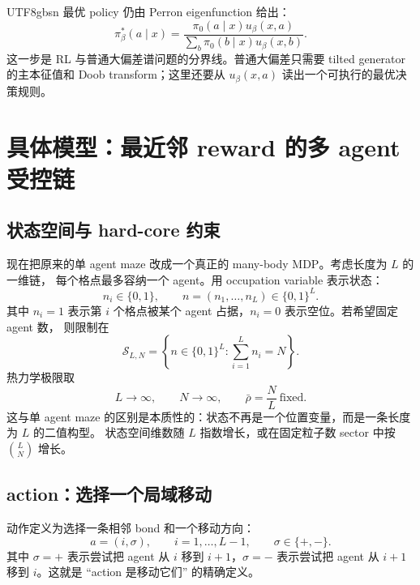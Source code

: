 \documentclass[11pt]{article}
\begin{document}
\begin{CJK*}{UTF8}{gbsn}
最优 policy 仍由 Perron eigenfunction 给出：
\begin{equation}
    \pi_\beta^*(a\mid x)
    =
    \frac{\pi_0(a\mid x)u_\beta(x,a)}
    {\sum_b\pi_0(b\mid x)u_\beta(x,b)}.
    \label{eq:many-body-policy}
\end{equation}
这一步是 RL 与普通大偏差谱问题的分界线。普通大偏差只需要 tilted generator 的主本征值和 Doob
transform；这里还要从 \(u_\beta(x,a)\) 读出一个可执行的最优决策规则。

\section{具体模型：最近邻 reward 的多 agent 受控链}

\subsection{状态空间与 hard-core 约束}

现在把原来的单 agent maze 改成一个真正的 many-body MDP。考虑长度为 \(L\) 的一维链，
每个格点最多容纳一个 agent。用 occupation variable 表示状态：
\begin{equation}
    n_i\in\{0,1\},
    \qquad
    n=(n_1,\dots,n_L)\in\{0,1\}^L.
\end{equation}
其中 \(n_i=1\) 表示第 \(i\) 个格点被某个 agent 占据，\(n_i=0\) 表示空位。若希望固定 agent 数，
则限制在
\begin{equation}
    \mathcal S_{L,N}
    =
    \left\{
        n\in\{0,1\}^L:
        \sum_{i=1}^L n_i=N
    \right\}.
    \label{eq:fixed-particle-sector}
\end{equation}
热力学极限取
\begin{equation}
    L\to\infty,
    \qquad
    N\to\infty,
    \qquad
    \bar\rho=\frac{N}{L}\ \text{fixed}.
\end{equation}
这与单 agent maze 的区别是本质性的：状态不再是一个位置变量，而是一条长度为 \(L\) 的二值构型。
状态空间维数随 \(L\) 指数增长，或在固定粒子数 sector 中按 \(\binom{L}{N}\) 增长。

\subsection{action：选择一个局域移动}

动作定义为选择一条相邻 bond 和一个移动方向：
\begin{equation}
    a=(i,\sigma),
    \qquad
    i=1,\dots,L-1,
    \qquad
    \sigma\in\{+,-\}.
    \label{eq:bond-action}
\end{equation}
其中 \(\sigma=+\) 表示尝试把 agent 从 \(i\) 移到 \(i+1\)，\(\sigma=-\) 表示尝试把 agent 从
\(i+1\) 移到 \(i\)。这就是 ``action 是移动它们'' 的精确定义。


\end{CJK*}
\end{document}
